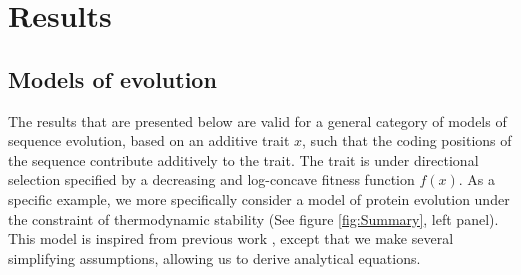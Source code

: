\documentclass{MBE}%
\begin{document}
\section*{Results}

\subsection*{Models of evolution}

The results that are presented below are valid for a general category of models of sequence evolution, based on an additive trait $x$, such that the coding positions of the sequence contribute additively to the trait.
The trait is under directional selection specified by a decreasing and log-concave fitness function $f(x)$. As a specific example, we more specifically consider a model of protein evolution under the constraint of thermodynamic stability (See figure \ref{fig:Summary}, left panel). This model is inspired from previous work \citep{Williams2006, Goldstein2011, Pollock2012}, except that we make several simplifying assumptions, allowing us to derive analytical equations. 
\end{document}

